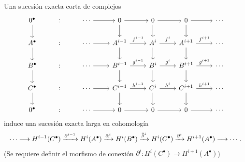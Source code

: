 \setcounter{eje}{9}
\begin{ejer}
Una sucesión exacta corta de complejos
\[\begin{tikzcd}
0^{\bullet} \arrow[d]
    & {:} & \cdots \arrow[r]
    & 0 \arrow[r] \arrow[d]
    & 0 \arrow[r] \arrow[d]
    & 0 \arrow[r] \arrow[d]
    & \cdots \\
A^{\bullet} \arrow[d]
    & {:} & \cdots \arrow[r]
    & A^{i-1} \arrow[r,"f^{i-1}"] \arrow[d]
    & A^i \arrow[r,"f^i"] \arrow[d]
    & A^{i+1} \arrow[r,"f^{i+1}"] \arrow[d]
    & \cdots \\
B^{\bullet} \arrow[d]
    & {:} & \cdots \arrow[r]
    & B^{i-1} \arrow[r,"g^{i-1}"] \arrow[d]
    & B^i \arrow[r,"g^i"] \arrow[d]
    & B^{i+1} \arrow[r,"g^{i+1}"] \arrow[d]
    & \cdots \\
C^{\bullet} \arrow[d]
    & {:} & \cdots \arrow[r]
    & C^{i-1} \arrow[r,"h^{i-1}"] \arrow[d]
    & C^i \arrow[r,"h^i"] \arrow[d]
    & C^{i+1} \arrow[r,"h^{i+1}"] \arrow[d]
    & \cdots \\
0^{\bullet}
    & {:} & \cdots \arrow[r]
    & 0 \arrow[r]
    & 0 \arrow[r]
    & 0 \arrow[r]
    & \cdots
\end{tikzcd}\]
induce una sucesión exacta larga en cohomología
\[
\cdots \longrightarrow H^{i-1}(C^{\bullet})
\xrightarrow{\partial^{i-1}} H^i(A^{\bullet})
\xrightarrow{\ubar\alpha^i} H^i(B^{\bullet})
\xrightarrow{\ubar\beta^i} H^i(C^{\bullet})
\xrightarrow{\partial^i} H^{i+1}(A^{\bullet})
\longrightarrow \cdots.
\]
(Se requiere definir el morfismo de conexión $\partial^i\colon H^{i}(C^\bullet) \to H^{i+1}({A^\bullet})$)
\end{ejer}
